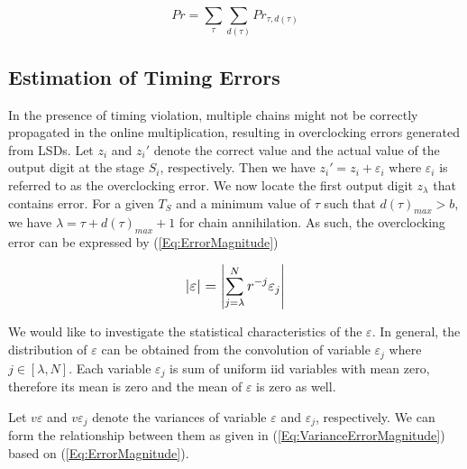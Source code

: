 \documentclass[journal]{IEEEtran}
\begin{document}
\begin{equation}\label{Eq:Prob_timingViol}
Pr= \sum_\tau \sum_{d(\tau)} Pr_{\tau,d(\tau )}
\end{equation}


\subsection{Estimation of Timing Errors}

In the presence of timing violation, multiple chains might not be correctly propagated in the online multiplication, resulting in overclocking errors generated from LSDs. Let $z_i$ and ${z_i}'$ denote the correct value and the actual value of the output digit at the stage $S_i$, respectively. Then we have ${z_i}'=z_i+\varepsilon_i$ where $\varepsilon_i$ is referred to as the overclocking error. We now locate the first output digit $z_{\lambda}$ that contains error. For a given $T_S$ and a minimum value of $\tau$ such that $d(\tau)_{max}>b$, we have $\lambda=\tau+d(\tau)_{max}+1$ for chain annihilation.
%
%
As such, the overclocking error can be expressed by (\ref{Eq:ErrorMagnitude})

%
\begin{eqnarray}\label{Eq:ErrorMagnitude}
\scriptsize
 \left| \varepsilon\right|= \left|\sum_{j=\lambda}^{N} r^{-j}\varepsilon_j\right|
\normalsize
\end{eqnarray}

We would like to investigate the statistical characteristics of the $\varepsilon$. In general, the distribution of $\varepsilon$ can be obtained from the convolution of variable $\varepsilon_j$ where $j\in[\lambda,N]$. Each variable $\varepsilon_j$ is sum of uniform iid variables with mean zero, therefore its mean is zero and the mean of $\varepsilon$ is zero as well.

Let $v\varepsilon$ and $v\varepsilon_j$ denote the variances of variable $\varepsilon$ and $\varepsilon_j$, respectively. We can form the relationship between them as given in (\ref{Eq:VarianceErrorMagnitude}) based on (\ref{Eq:ErrorMagnitude}).
\end{document}
